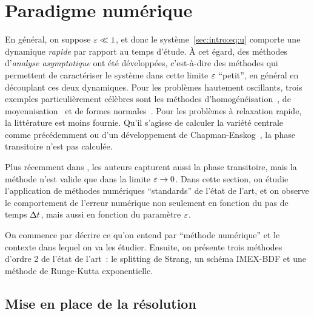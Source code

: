 \section*{Paradigme numérique}

En général, on suppose $\varepsilon \ll 1$, et donc le système~\eqref{sec:intro:eq:u} comporte une dynamique \textit{rapide} par rapport au temps d'étude. À cet égard, des méthodes d'\textit{analyse asymptotique} ont été développées, c'est-à-dire des méthodes qui permettent de caractériser le système dans cette limite $\varepsilon$ \enquote{petit}, en général en découplant ces deux dynamiques. Pour les problèmes hautement oscillants, trois exemples particulièrement célèbres sont les méthodes d'homogénéisation~\cite{goudon.2003.homogenization}, de moyennisation~\cite{perko.1969.higher,sanders.2007.averaging,lochak.1988.multiphase} et de formes normales~\cite{murdock.2006.normal,bambusi.2003.birkhoff}. Pour les problèmes à relaxation rapide, la littérature est moins fournie. Qu'il s'agisse de calculer la variété centrale comme précédemment ou d'un développement de Chapman-Enskog~\cite{santos.1986.divergence,degond.2004.macroscopic,chartier.2015.uniformly}, la phase transitoire n'est pas calculée. 

Plus récemment dans \cite{castella.2016.formal}, les auteurs capturent
aussi la phase transitoire, mais la méthode n'est valide que dans la
limite $\varepsilon \rightarrow 0$. Dans cette section, on étudie l'application
de méthodes numériques \enquote{standards} de l'état de l'art, et on
observe le comportement de l'erreur numérique non seulement en fonction
du pas de temps $\Delta t$, mais aussi en fonction du paramètre $\varepsilon$. 

On commence par décrire ce qu'on entend par \enquote{méthode numérique}
et le contexte dans lequel on va les étudier. Ensuite, on présente trois
méthodes d'ordre 2 de l'état de l'art~: le splitting de Strang, un
schéma IMEX-BDF et une méthode de Runge-Kutta exponentielle. 



\subsection*{Mise en place de la résolution}

